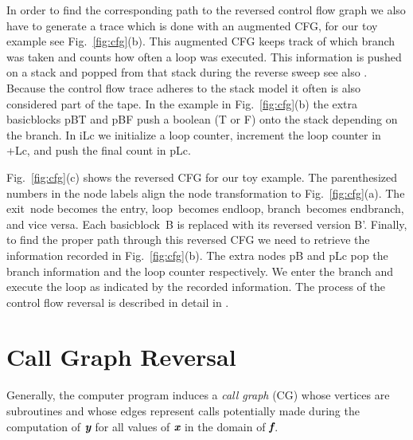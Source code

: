 \documentclass{book}
\newcommand{\entry}{entry}
\newcommand{\exit}{exit}
\newcommand{\Loop}{loop}
\newcommand{\EndLoop}{endloop}
\newcommand{\branch}{branch}
\newcommand{\EndBranch}{endbranch}
\newcommand{\basicblock}{basicblock}
\newcommand{\bmf}{\mbox{\bf\em f}}
\newcommand{\bmx}{\mbox{\bf\em x}}
\newcommand{\bmy}{\mbox{\bf\em y}}
\newcommand{\reffig}[1]{{Fig.~\ref{#1}}}
\begin{document}
In order to find the corresponding path to the reversed control flow graph 
we also have to generate a trace which is done with an augmented CFG,
for our toy example see \reffig{fig:cfg}(b).
This augmented CFG  keeps track of which branch was taken and counts how 
often a loop was 
executed.  
This information is pushed on  a stack and popped from that stack during the 
reverse sweep see also \cite{Utke2006ERo}. Because the control flow trace 
adheres to the stack model it often is also considered part of the tape. 
In the example in \reffig{fig:cfg}(b) the extra {\basicblock}s pBT and pBF push 
a boolean (T or F) onto the stack depending on the branch. 
In iLc we initialize a loop counter, increment the loop counter in +Lc, 
and push the final count in pLc. 

\reffig{fig:cfg}(c) shows the reversed CFG for our toy example. 
The parenthesized numbers in the node labels align the 
node transformation to \reffig{fig:cfg}(a). 
The \exit\ node becomes 
the \entry, \Loop\ becomes \EndLoop, \branch\ becomes \EndBranch, and vice versa. 
Each \basicblock\  B is replaced with its reversed version B'.  
Finally, to find the proper path through this reversed CFG we need to retrieve 
the information recorded in  \reffig{fig:cfg}(b). The extra nodes pB and pLc 
pop the branch information and the loop counter respectively.  
We enter the branch and execute the loop as indicated by the recorded information. 
The process of the control flow reversal is described in detail in 
\cite{Utke2006ERo}. 

\section{Call Graph Reversal} \label{sec:cgReversal}

Generally, the computer program 
induces a {\em call graph} (CG) \cite{ASU86}
whose vertices are subroutines and whose edges 
represent calls potentially made during the computation of $\bmy$ for all 
values of $\bmx$ in the domain of $\bmf$.
\end{document}
